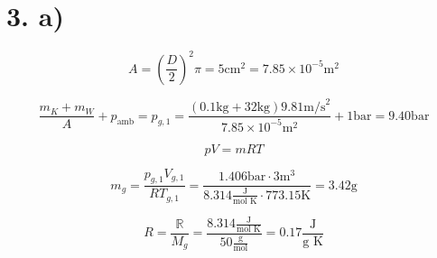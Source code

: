 \section*{3. a)}

\[
A = \left( \frac{D}{2} \right)^2 \pi = 5 \text{cm}^2 = 7.85 \times 10^{-5} \text{m}^2
\]

\[
\frac{m_K + m_W}{A} + p_{\text{amb}} = p_{g,1} = \frac{(0.1 \text{kg} + 32 \text{kg}) 9.81 \text{m/s}^2}{7.85 \times 10^{-5} \text{m}^2} + 1 \text{bar} = 9.40 \text{bar}
\]

\[
pV = mRT
\]

\[
m_g = \frac{p_{g,1} V_{g,1}}{R T_{g,1}} = \frac{1.406 \text{bar} \cdot 3 \text{m}^3}{8.314 \frac{\text{J}}{\text{mol K}} \cdot 773.15 \text{K}} = 3.42 \text{g}
\]

\[
R = \frac{\mathbb{R}}{M_g} = \frac{8.314 \frac{\text{J}}{\text{mol K}}}{50 \frac{\text{g}}{\text{mol}}} = 0.17 \frac{\text{J}}{\text{g K}}
\]